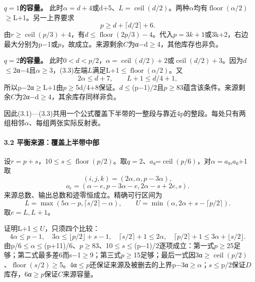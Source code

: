 \textbf{{\ensuremath{q=1}的容量。}} {此时\ensuremath{\alpha =d+4}或d+5、\ensuremath{L=\operatorname{ceil}(d/2)}。两种\ensuremath{\alpha }均有\ensuremath{\operatorname{floor}(\alpha /2)}\ensuremath{\ge}L+1。另一上界要求} \[
p\ge d+\lceil d/2\rceil+6.
\] {由\ensuremath{r}\ensuremath{\ge}\ensuremath{\operatorname{ceil}(p/3)+4}，有\ensuremath{d}\ensuremath{\le}\ensuremath{\operatorname{floor}(2p/3)-4}。代入\ensuremath{p=3k+1}或3k+2，右边最大分别为p−1或\ensuremath{p}，故成立。来源剩余\ensuremath{C}为α−d\ensuremath{\ge}4，其他库存也非负。}

\textbf{{\ensuremath{q=2}的容量。}} {此时\ensuremath{0<d<p/2}，\ensuremath{\alpha =\operatorname{ceil}(d/2)+2}或\ensuremath{\operatorname{ceil}(d/2)+3}。因为\ensuremath{d}\ensuremath{\le}2α−4且\ensuremath{\alpha }\ensuremath{\ge}3，(3.3)左端\ensuremath{L}满足L+1\ensuremath{\le}\ensuremath{\operatorname{floor}(\alpha /2)}。又} \[
2\alpha\le d+7,\qquad L+1\le d/4+1,
\] {所以p−2α\ensuremath{\ge}L+1由\ensuremath{p}\ensuremath{\ge}5d/4+8保证。\ensuremath{d}\ensuremath{\le}(p−1)/2且\ensuremath{p}\ensuremath{\ge}83蕴含该条件。来源剩余\ensuremath{C}为2α−d\ensuremath{\ge}4，其余库存同样非负。}

{因此(3.1)---(3.3)共用一个公式覆盖下半带的一整段与靠近4p的整段。每处只有两组相邻\ensuremath{\alpha }、每组两张实际反射表。}

\paragraph*{\texorpdfstring{{3.2} {平衡来源：覆盖上半带中部}}{3.2 平衡来源：覆盖上半带中部}}\label{C18-h133}

{设\ensuremath{r=p+s}，10\ensuremath{\le}\ensuremath{s}\ensuremath{\le}\ensuremath{\operatorname{floor}(p/2)}。取\ensuremath{q=2}、\ensuremath{a}₀=\ensuremath{\operatorname{ceil}(p/6)}，对\ensuremath{\alpha =a}₀,\ensuremath{a}₀+1取} \[
\boxed{(i,j,k)=(2\alpha,\alpha,p-3\alpha),}
\] \[
\boxed{o_e=(\alpha-e,p-3\alpha-e,2\alpha-s+2e,s).}
\tag{C18.3.4}
\] {来源总数、输出总数和迹零恒成立。精确可行区间为} \[
L=\max(5\alpha-p,\lceil s/2\rceil-\alpha),\qquad
U=\min(\alpha,2\alpha+s-\lceil p/2\rceil).
\tag{C18.3.5}
\] {取\ensuremath{e=L,L+1}。}

{证明L+1\ensuremath{\le}\ensuremath{U}，只须四个比较：} \[
4\alpha\le p-1,\quad
3\alpha\le\lfloor p/2\rfloor+s-1,\quad
\lceil s/2\rceil+1\le2\alpha,\quad
\lceil p/2\rceil+1\le3\alpha+\lfloor s/2\rfloor.
\tag{C18.3.6}
\] {由p/6\ensuremath{\le}\ensuremath{\alpha }\ensuremath{\le}(p+11)/6、\ensuremath{p}\ensuremath{\ge}83、10\ensuremath{\le}\ensuremath{s}\ensuremath{\le}(p−1)/2逐项成立：第一式\ensuremath{p}\ensuremath{\ge}25足够；第二式最多差6而s−1\ensuremath{\ge}9；第三式\ensuremath{p}\ensuremath{\ge}15足够；最后一式因3α\ensuremath{\ge}\ensuremath{\operatorname{ceil}(p/2)}、\ensuremath{\operatorname{floor}(s/2)}\ensuremath{\ge}5。4α\ensuremath{\le}\ensuremath{p}还保证来源及被删去的上界p−3α\ensuremath{\ge}\ensuremath{\alpha }；\ensuremath{s}\ensuremath{\le}p/2保证\ensuremath{D}库存，6α\ensuremath{\ge}\ensuremath{p}保证\ensuremath{C}来源容量。}

